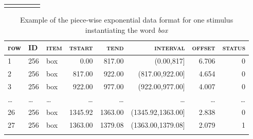 \begin{table}[H]
\begin{tabular}{llccc}
\lspbottomrule
\end{tabular}
\end{table}





\begin{table}[H]\fontsize{10}{11}
\caption{Example of the piece-wise exponential data format for one stimulus instantiating the word \textit{box}}
\label{tab:7.4}
\centering
\begin{tabular}{lllrrrrr} 
\lsptoprule
row & \textsc{ID}  & \textsc{item} & \textsc{tstart}  & \textsc{tend}    & \textsc{interval}          & \textsc{offset} & \textsc{status}  \\ 
\midrule
1   & 256 & box  & 0.00    & 817.00  & (0.00,817]        & 6.706  & 0       \\
2   & 256 & box  & 817.00  & 922.00  & (817.00,922.00]   & 4.654  & 0       \\
3   & 256 & box  & 922.00  & 977.00  & (922.00,977.00]   & 4.007  & 0       \\
…   & …   & …    & …       & …       & …                 & …      & …       \\
26  & 256 & box  & 1345.92 & 1363.00 & (1345.92,1363.00] & 2.838  & 0       \\
27  & 256 & box  & 1363.00 & 1379.08 & (1363.00,1379.08] & 2.079  & 1       \\
\lspbottomrule
\end{tabular}
\end{table}






